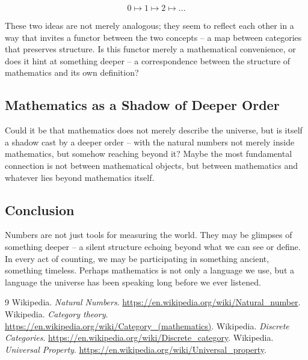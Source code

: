 \documentclass{article}
\begin{document}
$$
    0 \mapsto 1 \mapsto 2 \mapsto \ldots
$$

These two ideas are not merely analogous; they seem to reflect each other in a way that invites a functor between the two concepts -- a map between categories that preserves structure. Is this functor merely a mathematical convenience, or does it hint at something deeper -- a correspondence between the structure of mathematics and its own definition?

\subsection*{Mathematics as a Shadow of Deeper Order}

Could it be that mathematics does not merely describe the universe, but is itself a shadow cast by a deeper order -- with the natural numbers not merely inside mathematics, but somehow reaching beyond it? Maybe the most fundamental connection is not between mathematical objects, but between mathematics and whatever lies beyond mathematics itself.

\subsection*{Conclusion}

Numbers are not just tools for measuring the world. They may be glimpses of something deeper -- a silent structure echoing beyond what we can see or define. In every act of counting, we may be participating in something ancient, something timeless. Perhaps mathematics is not only a language we use, but a language the universe has been speaking long before we ever listened.


\vspace{3em}

\begin{thebibliography}{9}
 Wikipedia. \textit{Natural Numbers}. \url{https://en.wikipedia.org/wiki/Natural_number}.
 Wikipedia. \textit{Category theory}. \url{https://en.wikipedia.org/wiki/Category_(mathematics)}.
 Wikipedia. \textit{Discrete Categories}. \url{https://en.wikipedia.org/wiki/Discrete_category}.
 Wikipedia. \textit{Universal Property}. \url{https://en.wikipedia.org/wiki/Universal_property}.
\end{thebibliography}
\end{document}
